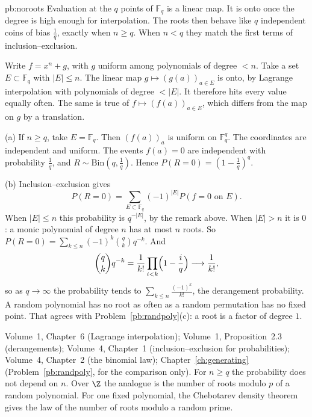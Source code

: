 \begin{solution}{pb:noroots}
\idea Evaluation at the $q$ points of $\mathbb F_q$ is a linear map. It is onto once the degree is high enough for interpolation. The roots then
behave like $q$ independent coins of bias $\frac1q$, exactly when $n\ge q$. When $n<q$ they match the first terms of inclusion--exclusion.

\writeup Write $f=x^n+g$, with $g$ uniform among polynomials of degree $<n$. Take a set $E\subset\mathbb F_q$ with $|E|\le n$. The linear map
$g\mapsto(g(a))_{a\in E}$ is onto, by Lagrange interpolation with polynomials of degree $<|E|$. It therefore hits every value equally often.
The same is true of $f\mapsto(f(a))_{a\in E}$, which differs from the map on $g$ by a translation.

(a) If $n\ge q$, take $E=\mathbb F_q$. Then $(f(a))_a$ is uniform on $\mathbb F_q^q$. The coordinates are independent and uniform. The events
$f(a)=0$ are independent with probability $\frac1q$, and $R\sim\mathrm{Bin}(q,\frac1q)$. Hence $P(R=0)=(1-\frac1q)^q$.

(b) Inclusion--exclusion gives
\[
P(R=0)=\sum_{E\subset\mathbb F_q}(-1)^{|E|}P(f=0\text{ on }E).
\]
When $|E|\le n$ this probability is $q^{-|E|}$, by the
remark above. When $|E|>n$ it is $0$: a monic polynomial of degree $n$ has at most $n$ roots. So
$P(R=0)=\sum_{k\le n}(-1)^k\binom qkq^{-k}$. And
\[
\binom qkq^{-k}=\frac1{k!}\prod_{i<k}\Bigl(1-\frac iq\Bigr)\longrightarrow\frac1{k!},
\]
so as $q\to\infty$ the probability tends to $\sum_{k\le n}\frac{(-1)^k}{k!}$, the derangement probability. A random polynomial has no root as often as a random
permutation has no fixed point. That agrees with Problem~\ref{pb:randpoly}(c): a root is a factor of degree $1$.

\tools Volume~1, Chapter~6 (Lagrange interpolation); Volume~1, Proposition~2.3 (derangements); Volume~4, Chapter~1 (inclusion--exclusion for probabilities); Volume~4, Chapter~2 (the binomial law);
Chapter~\ref{ch:generating} (Problem~\ref{pb:randpoly}, for the comparison only).
\leads For $n\ge q$ the probability does not depend on $n$. Over $\Z$ the analogue is the number of roots modulo $p$ of a random
polynomial. For one fixed polynomial, the Chebotarev density theorem gives the law of the number of roots modulo a random prime.
\end{solution}

